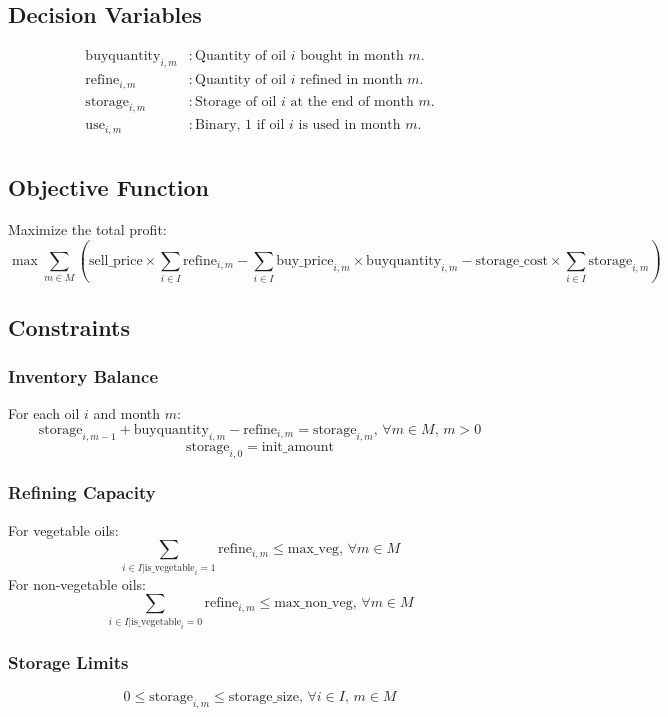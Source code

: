 \documentclass{article}
\begin{document}
\subsection*{Decision Variables}
\begin{align*}
\text{buyquantity}_{i, m} & : \text{Quantity of oil } i \text{ bought in month } m. \\
\text{refine}_{i, m} & : \text{Quantity of oil } i \text{ refined in month } m. \\
\text{storage}_{i, m} & : \text{Storage of oil } i \text{ at the end of month } m. \\
\text{use}_{i, m} & : \text{Binary, 1 if oil } i \text{ is used in month } m. \\
\end{align*}

\subsection*{Objective Function}
Maximize the total profit:
\[
\max \sum_{m \in M} \left( \text{sell\_price} \times \sum_{i \in I} \text{refine}_{i, m} - \sum_{i \in I} \text{buy\_price}_{i, m} \times \text{buyquantity}_{i, m} - \text{storage\_cost} \times \sum_{i \in I} \text{storage}_{i, m} \right)
\]

\subsection*{Constraints}

\subsubsection*{Inventory Balance}
For each oil \(i\) and month \(m\):
\[
\text{storage}_{i, m-1} + \text{buyquantity}_{i, m} - \text{refine}_{i, m} = \text{storage}_{i, m}, \, \forall m \in M, \, m > 0
\]
\[
\text{storage}_{i, 0} = \text{init\_amount}
\]

\subsubsection*{Refining Capacity}
For vegetable oils:
\[
\sum_{i \in I | \text{is\_vegetable}_{i} = 1} \text{refine}_{i, m} \leq \text{max\_veg}, \, \forall m \in M
\]
For non-vegetable oils:
\[
\sum_{i \in I | \text{is\_vegetable}_{i} = 0} \text{refine}_{i, m} \leq \text{max\_non\_veg}, \, \forall m \in M
\]

\subsubsection*{Storage Limits}
\[
0 \leq \text{storage}_{i, m} \leq \text{storage\_size}, \, \forall i \in I, \, m \in M
\]
\end{document}
